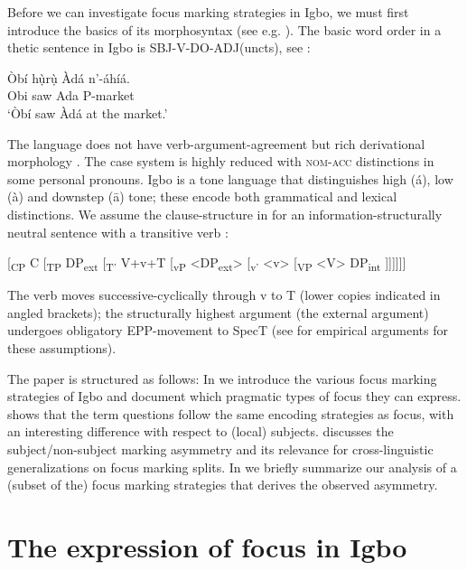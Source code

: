 \documentclass[output=paper,colorlinks,citecolor=brown]{langscibook}
\begin{document}
Before we can investigate focus marking strategies in Igbo, we must first introduce the basics of its morphosyntax (see e.g. \citealt{GreenIgwe1963, Carrel1970, Manfredi1991, Mbah2006, Emenanjo2015}). The basic word order in a thetic sentence in Igbo is SBJ-V-DO-ADJ(uncts), see :

\ea%
    \label{ex:amaechi:1}
    \gll    Òbí hụ̀rụ̀ Àdá n'-áhíá.\\
            Obi saw Ada P-market\\
    \glt    `Òbí saw Àdá at the market.'
\z

\begin{sloppypar}
The language does not have verb-argument-agreement but rich derivational morphology \citep{Uwalaka1988}. The case system is highly reduced with \textsc{nom-acc} distinctions in some personal pronouns. Igbo is a tone language that distinguishes high (\'a), low (\`a) and downstep (\=a) tone; these encode both grammatical and lexical distinctions. We assume the clause-structure in  for an information-structurally neutral sentence with a transitive verb \citep{AmaechiGeorgi2019}:
\end{sloppypar}

\ea%
    \label{ex:amaechi:2}
    [\textsubscript{CP} C [\textsubscript{{TP}} DP\textsubscript{{ext}} [\textsubscript{{T'}} V+v+T [\textsubscript{{vP}} <DP\textsubscript{{ext}}> [\textsubscript{v'} <v> [\textsubscript{VP} <V> DP\textsubscript{{int}} ]]]]]]
\z

The verb moves successive-cyclically through v to T (lower copies indicated in angled brackets); the structurally highest argument (the external argument) undergoes obligatory EPP-movement to SpecT (see \citealt{AmaechiGeorgi2019} for empirical arguments for these assumptions).\largerpage

The paper is structured as follows: In  we introduce the various focus marking strategies of Igbo and document which pragmatic types of focus they can express.  shows that the term questions follow the same encoding strategies as focus, with an interesting difference with respect to (local) subjects.  discusses the subject/non-subject marking asymmetry and its relevance for cross-linguistic generalizations on focus marking splits. In  we briefly summarize our analysis of a (subset of the) focus marking strategies that derives the observed asymmetry.

\section{The expression of focus in Igbo}\label{sec:amaechi:2}
\end{document}
